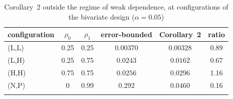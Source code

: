 \begin{table}[t]
\caption{Corollary~2 outside the regime of weak dependence, at configurations of the bivariate design ($\alpha=0.05$)}\label{tab:weakbeyond}
\small
\begin{tabular*}{\textwidth}{@{\extracolsep\fill}lccccc@{}}
\toprule
configuration & $\rho_0$ & $\rho_1$ & error-bounded & Corollary~2 & ratio\\
\midrule
(L,L) & 0.25 & 0.25 & $0.00370$ & $0.00328$ & 0.89\\
(L,H) & 0.25 & 0.75 & $0.0243$ & $0.0162$ & 0.67\\
(H,H) & 0.75 & 0.75 & $0.0256$ & $0.0296$ & 1.16\\
(N,P) & 0 & 0.99 & $0.292$ & $0.0460$ & 0.16\\
\botrule
\end{tabular*}
\end{table}
